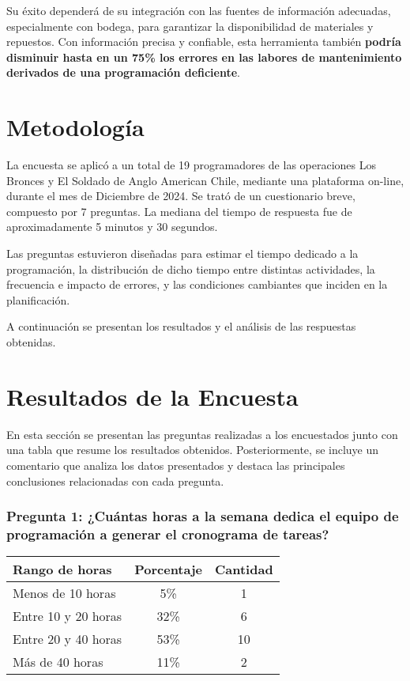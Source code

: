 \documentclass{article}
\begin{document}
Su éxito dependerá de su integración con las fuentes de información adecuadas, especialmente con bodega, para garantizar la disponibilidad de materiales y repuestos. Con información precisa y confiable, esta herramienta también \textbf{podría disminuir hasta en un 75\% los errores en las labores de mantenimiento derivados de una programación deficiente}.

\section*{Metodología}

La encuesta se aplicó a un total de 19 programadores de las operaciones Los Bronces y El Soldado de Anglo American Chile, mediante una plataforma on-line, durante el mes de Diciembre de 2024. Se trató de un cuestionario breve, compuesto por 7 preguntas. La mediana del tiempo de respuesta fue de aproximadamente 5 minutos y 30 segundos. 

Las preguntas estuvieron diseñadas para estimar el tiempo dedicado a la programación, la distribución de dicho tiempo entre distintas actividades, la frecuencia e impacto de errores, y las condiciones cambiantes que inciden en la planificación.

A continuación se presentan los resultados y el análisis de las respuestas obtenidas.

\section*{Resultados de la Encuesta}

En esta sección se presentan las preguntas realizadas a los encuestados junto con una tabla que resume los resultados obtenidos. Posteriormente, se incluye un comentario que analiza los datos presentados y destaca las principales conclusiones relacionadas con cada pregunta.

\vspace{.5em}
\subsubsection*{Pregunta 1: ¿Cuántas horas a la semana dedica el equipo de programación a generar el cronograma de tareas?}



\begin{table}[H]
    \centering
    \begin{tabular}{lcc}
        \toprule
        \textbf{Rango de horas} & \textbf{Porcentaje} & \textbf{Cantidad} \\
        \midrule
        Menos de 10 horas & 5\% & 1 \\
        Entre 10 y 20 horas & 32\% & 6 \\
        Entre 20 y 40 horas & 53\% & 10 \\
        Más de 40 horas & 11\% & 2 \\
        \bottomrule
    \end{tabular}
    \label{tab:horas_semanales}
\end{table}
\end{document}
